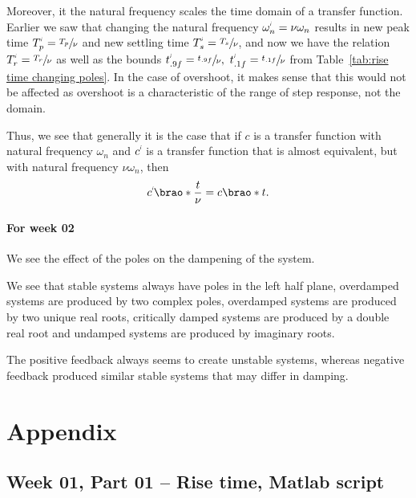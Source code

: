\documentclass[12pt]{article}
\DeclarePairedDelimiter\brao()%
\newcommand{\setprime}[2][1]{%
    {#2}^{%
        \raisebox{1pt}{%
            \scalebox{0.5}{%
                \itshape\sffamily\uppercase%
                \expandafter{%
                    \romannumeral#1%
                }%
            }%
        }
    }%
}%
\begin{document}
Moreover, it the natural frequency
scales the time domain
of a transfer function.
Earlier we saw that changing the natural frequency $\setprime\omega_n = \nu\omega_n$ results in
new peak time $\setprime{T}_p = \sfrac{T_p}\nu$ and
new settling time $\setprime{T}_s = \sfrac{T_s}\nu$,
and now we have the relation $\setprime{T}_r = \sfrac{T_r}\nu$
as well as the bounds $\setprime{t}_{.9f} = \sfrac{t_{.9f}}\nu,\ \setprime{t}_{.1f} = \sfrac{t_{.1f}}\nu$
from Table~\ref{tab:rise time changing poles}.
In the case of overshoot, it makes sense that this would not be affected
as overshoot is a characteristic of the range of step response, not the domain.

Thus, we see that generally it is the case that if $c$ is a transfer function with natural frequency $\omega_n$
and $\setprime{c}$ is a transfer function that is almost equivalent, but with natural frequency $\nu\omega_n$,
then
\begin{equation}
    \setprime{c}\brao*{\frac{t}\nu} = c\brao*t.
\end{equation}

\paragraph{For week 02}

We see the effect of the poles on the dampening of the system.

We see that stable systems always have poles in the left half plane, overdamped systems are produced by two complex poles, overdamped systems are produced by two unique real roots, critically damped systems are produced by a double real root and undamped systems are produced by imaginary roots.

The positive feedback always seems to create unstable systems, whereas negative feedback produced similar stable systems that may differ in damping.

\newpage
\printbibliography

\newpage
\appendix
\section{Appendix}

\subsection{Week 01, Part 01 -- Rise time, Matlab script}\label{sap:solving for .9cf and .1cf}
\inputminted{matlab}{src/part01a_rise_time.m}
\end{document}

